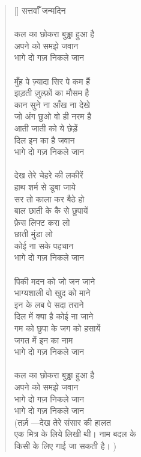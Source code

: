 \begin{verse}[\versewidth]
{सत्तर्वाँ जन्मदिन\\
\\
कल का छोकरा बुड्ढा हुआ है\\
अपने को समझे जवान\\
भागे दो गज़ निकले जान\\
\\
मुँह पे ज़्यादा सिर पे कम हैं\\
झड़ती ज़ुल्फ़ों का मौसम है\\
कान सुने ना आँख ना देखे\\
जो अंग छुओ वो ही नरम है\\
आती जाती को ये छेड़ें\\
दिल इन का है जवान\\
भागे दो गज़ निकले जान\\
\\
देख तेरे चेहरे की लकीरें\\
हाथ शर्म से डूबा जाये\\
सर तो काला कर बैठे हो\\
बाल छाती के कै से छुपायें\\
फ़ेस लिफ्ट करा लो\\
छाती मुंडा लो\\
कोई ना सके पहचान\\
भागे दो गज़ निकले जान\\
\\
पिकी मदन को जो जन जाने\\
भाग्यशाली वो खुद को माने\\
इन के लब पे सदा तराने\\
दिल में क्या है कोई ना जाने\\
गम को छुपा के जग को हसायें\\
जगत में इन का नाम \\
भागे दो गज़ निकले जान\\
\\
कल का छोकरा बुड्ढा हुआ है\\
अपने को समझे जवान\\
भागे दो गज़ निकले जान\\
भागे दो गज़ निकले जान\\
(तर्ज़ —देख तेरे संसार की हालत\\
एक मित्र के लिये लिखी थी। नाम बदल के\\
किसी के लिए गाई जा सकती है।
)
}\end{verse}

